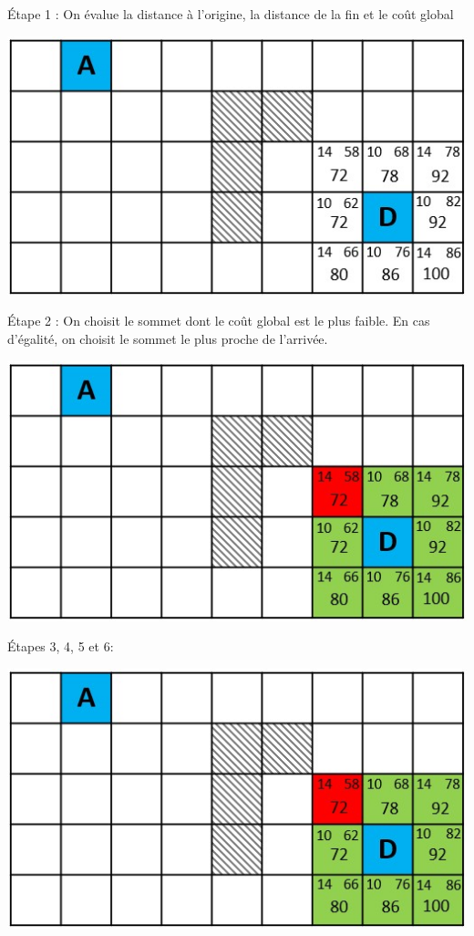 \'Etape 1 : On évalue la distance à l'origine, la distance de la fin et le coût global
\begin{center}
\includegraphics[scale=0.8]{images/quadri3.jpg}
\end{center}

\'Etape 2 : On choisit le sommet dont le coût global est le plus faible. En cas d'égalité, on choisit le sommet le plus proche de l'arrivée.
\begin{center}
\includegraphics[scale=0.8]{images/quadri4.jpg}
\end{center}

\newpage
\'Etapes 3, 4, 5 et 6:
\begin{center}
\includegraphics[scale=0.8]{images/quadri4.jpg}
\end{center}

